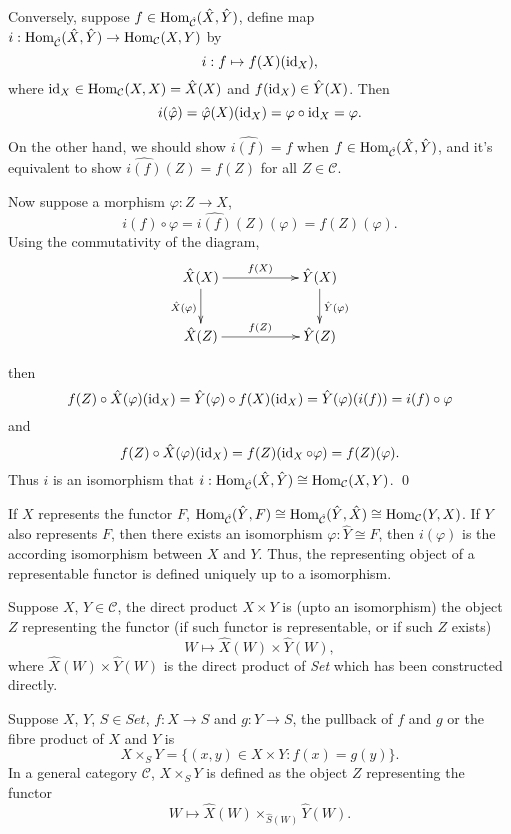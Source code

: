 \documentclass[9pt]{extarticle}
\newcommand{\cc}{\mathcal{C}}
\begin{document}
	Conversely, suppose $f\in \Hom_{\hat{\cc}} (\hat{X},\hat{Y})$, define map $i:\Hom_{\hat{\cc}} (\hat{X},\hat{Y})\to \Hom_\cc (X,Y)$ by 
	\[
		i:f\mapsto f(X)(\operatorname{id}_X),
	\]
	where $\id_X\in \Hom_\cc(X,X)=\hat{X}(X)$ and $f(\operatorname{id}_X)\in \hat{Y}(X)$. Then 
	\[
		i(\hat{\varphi})=\hat{\varphi}(X)(\operatorname{id}_X)=\varphi\circ \operatorname{id}_X=\varphi.
	\]

	On the other hand, we should show $\widehat{i(f)}=f$ when $f\in \Hom_{\hat{\cc}} (\hat{X},\hat{Y})$, and it's equivalent to show $\widehat{i(f)}(Z)=f(Z)$ for all $Z\in\cc$.

	Now suppose a morphism $\varphi:Z\to X$,
	\[
		i(f)\circ\varphi=\widehat{i(f)}(Z)(\varphi)=f(Z)(\varphi).
	\]
	Using the commutativity of the diagram,
	\[
	\begin{xy}
		\xymatrix{
			\hat{X}(X)\ar[rr]^{f(X)} \ar[d]_{\hat{X}(\varphi)}&&\hat{Y}(X) \ar[d]^{\hat{Y}(\varphi)}\\
			\hat{X}(Z)\ar[rr]^{f(Z)}&&\hat{Y}(Z)
		}
	\end{xy}
	\]

	\noindent then
	\[
		f(Z)\circ\hat{X}(\varphi)(\operatorname{id}_X)=\hat{Y}(\varphi)\circ f(X)(\operatorname{id}_X)=\hat{Y}(\varphi)(i(f))=i(f)\circ \varphi
	\]
	and
	\[
		f(Z)\circ\hat{X}(\varphi)(\operatorname{id}_X)=f(Z)(\operatorname{id}_X\circ\varphi)=f(Z)(\varphi).
	\]
	Thus $i$ is an isomorphism that $i:\Hom_{\hat{\cc}} (\hat{X},\hat{Y})\cong \Hom_\cc (X,Y)$.
\qed

If $X$ represents the functor $F$, $\Hom_{\hat{\cc}}(\hat{Y},F)\cong \Hom_{\hat{\cc}}(\hat{Y},\hat{X})\cong\Hom_\cc(Y,X)$. If $Y$ also represents $F$, then there exists an isomorphism $\varphi:\hat{Y}\cong F$, then $i(\varphi)$ is the according isomorphism between $X$ and $Y$. Thus, the representing object of a representable functor is defined uniquely up to a isomorphism.

\pro
	Suppose $X$, $Y\in\cc$, the direct product $X\times Y$ is (upto an isomorphism) the object $Z$ representing the functor (if such functor is representable, or if such $Z$ exists)
	\[
		W\mapsto \hat{X}(W)\times\hat{Y}(W),
	\]
	where $\hat{X}(W)\times\hat{Y}(W)$ is the direct product of \textit{Set} which has been constructed directly.

\pro
	Suppose $X$, $Y$, $S\in\textit{Set}$, $f:X\to S$ and $g:Y\to S$, the pullback of $f$ and $g$ or the fibre product of $X$ and $Y$ is
	\[
		X\times_S Y=\{(x,y)\in X\times Y:f(x)=g(y)\}.
	\]
	In a general category $\cc$, $X\times_SY$ is defined as the object $Z$ representing the functor
	\[
		W\mapsto \hat{X}(W)\times_{\hat{S}(W)}\hat{Y}(W).
	\]
\end{document}
